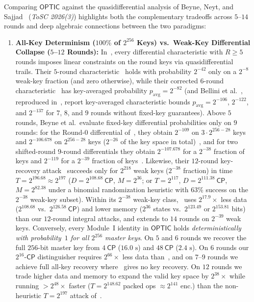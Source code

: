 \documentclass[11pt,a4paper]{article}
\theoremstyle{definition}
\theoremstyle{remark}
\newcommand{\OPTIC}{\mathsf{OPTIC}}
\newcommand{\CP}{\mathsf{CP}}
\begin{document}
Comparing $\OPTIC$ against the quasidifferential analysis of Beyne, Neyt, and Sajjad~\cite{BNS26} (\emph{ToSC 2026(3)}) highlights both the complementary tradeoffs across $5$--$14$ rounds and deep algebraic connections between the two paradigms:
\begin{enumerate}[leftmargin=1.8em]
    \item \textbf{All-Key Determinism ($100\%$ of $2^{256}$ Keys) vs.\ Weak-Key Differential Collapse ($5$--$12$ Rounds):}
    In~\cite{BNS26}, every differential characteristic with $R \ge 5$ rounds imposes linear constraints on the round keys via quasidifferential trails. Their $5$-round characteristic~\cite[Example~1, pp.~7--8]{BNS26} holds with probability $2^{-42}$ only on a $2^{-8}$ weak-key fraction (and zero otherwise), while their corrected $6$-round characteristic~\cite[Remark~1 and Appendix~A]{BNS26} has key-averaged probability $p_{\mathrm{avg}} = 2^{-82}$ (and Bellini et al.~\cite[Table~4]{BFG24}, reproduced in~\cite[Table~3]{BNS26}, report key-averaged characteristic bounds $p_{\mathrm{avg}} = 2^{-106}$, $2^{-122}$, and $2^{-137}$ for $7$, $8$, and $9$ rounds without fixed-key guarantees). Above $5$ rounds, Beyne et al.\ evaluate fixed-key differential probabilities only on $9$ rounds: for the Round-$0$ differential of~\cite{BFG24}, they obtain $2^{-109}$ on $3 \cdot 2^{256-28}$ keys and $2^{-106.678}$ on $2^{256-28}$ keys ($2^{-26}$ of the key space in total)~\cite[$\S$3.3]{BNS26}, and for two shifted-round $9$-round differentials they obtain $2^{-107.678}$ for a $2^{-38}$ fraction of keys and $2^{-119}$ for a $2^{-39}$ fraction of keys~\cite[$\S$5.2--5.3]{BNS26}. Likewise, their $12$-round key-recovery attack~\cite[$\S$6.1, Table~1]{BNS26} succeeds only for $2^{218}$ weak keys ($2^{-38}$ fraction) in time $T = 2^{196.68} \approx 2^{197}$ ($D = 2^{108.68}~\CP$, $M = 2^{36}$; or $T = 2^{117}$, $D = 2^{111.38}~\CP$, $M = 2^{82.38}$ under a binomial randomization heuristic with $63\%$ success on the $2^{-38}$ weak-key subset). Within its $2^{-38}$ weak-key class,~\cite[$\S$6.1]{BNS26} uses $2^{17.9}\times$ less data ($2^{108.68}$ vs.\ $2^{126.58}~\CP$) and lower memory ($2^{36}$ states vs.\ $2^{123.49}$ or $2^{153.81}$ bits) than our $12$-round integral attacks, and extends to $14$ rounds on $2^{-39}$ weak keys. Conversely, every Module~I identity in $\OPTIC$ holds \emph{deterministically with probability~$1$ for all $2^{256}$ master keys}. On $5$ and $6$ rounds we recover the full $256$-bit master key from $4~\CP$ ($16.0\text{ s}$) and $48~\CP$ ($2.4\text{ s}$). On $6$ rounds our $2^{16}\text{-}\CP$ distinguisher requires $2^{66}\times$ less data than~\cite[Appendix~A]{BNS26}, and on $7$--$9$ rounds we achieve full all-key recovery where~\cite{BNS26} gives no key recovery. On $12$ rounds we trade higher data and memory to expand the valid key space by $2^{38}\times$ while running $>2^{48}\times$ faster ($T = 2^{148.62}$ packed ops $\approx 2^{141}$ enc.) than the non-heuristic $T = 2^{197}$ attack of~\cite[Table~1]{BNS26}.

\end{enumerate}
\end{document}
